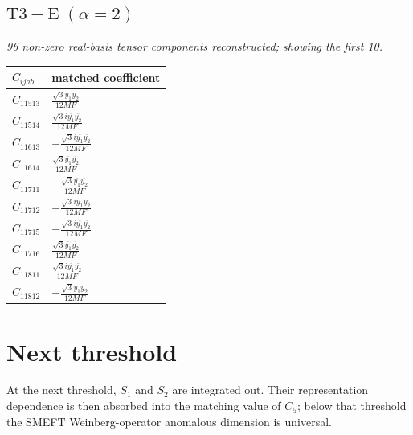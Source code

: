 \documentclass[9pt]{article}
\begin{document}
\subsection*{$ \mathrm{T3-E}\;(\alpha=2) $}
\textit{96 non-zero real-basis tensor components reconstructed; showing the first 10.}
\begin{longtable}{@{}ll@{}}
\toprule
$C_{ijab}$ & matched coefficient \\
\midrule
$C_{11513}$ & $ \frac{\sqrt{3} \overline{y_{1}} \overline{y_{2}}}{12 MF} $ \\
$C_{11514}$ & $ \frac{\sqrt{3} i \overline{y_{1}} \overline{y_{2}}}{12 MF} $ \\
$C_{11613}$ & $ - \frac{\sqrt{3} i \overline{y_{1}} \overline{y_{2}}}{12 MF} $ \\
$C_{11614}$ & $ \frac{\sqrt{3} \overline{y_{1}} \overline{y_{2}}}{12 MF} $ \\
$C_{11711}$ & $ - \frac{\sqrt{3} \overline{y_{1}} \overline{y_{2}}}{12 MF} $ \\
$C_{11712}$ & $ - \frac{\sqrt{3} i \overline{y_{1}} \overline{y_{2}}}{12 MF} $ \\
$C_{11715}$ & $ - \frac{\sqrt{3} i \overline{y_{1}} \overline{y_{2}}}{12 MF} $ \\
$C_{11716}$ & $ \frac{\sqrt{3} \overline{y_{1}} \overline{y_{2}}}{12 MF} $ \\
$C_{11811}$ & $ \frac{\sqrt{3} i \overline{y_{1}} \overline{y_{2}}}{12 MF} $ \\
$C_{11812}$ & $ - \frac{\sqrt{3} \overline{y_{1}} \overline{y_{2}}}{12 MF} $ \\
\bottomrule
\end{longtable}
\section*{Next threshold}
At the next threshold, $S_1$ and $S_2$ are integrated out.  Their representation dependence is then absorbed into the matching value of $C_5$; below that threshold the SMEFT Weinberg-operator anomalous dimension is universal.
\end{document}
